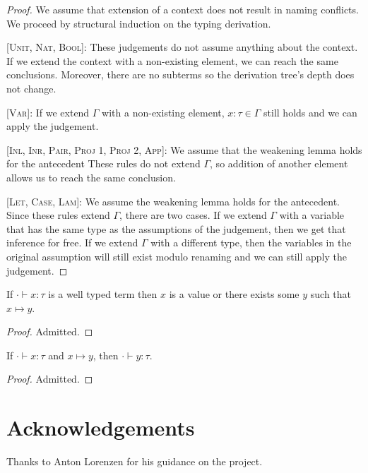 \documentclass[nonacm]{acmart}
\begin{document}
  \begin{proof}
    We assume that extension of a context does not result in naming conflicts.
    We proceed by structural induction on the typing derivation.

    [\textsc{Unit, Nat, Bool}]: These judgements do not assume anything about
    the context. If we extend the context with a non-existing element, we can
    reach the same conclusions. Moreover, there are no subterms so the derivation
    tree's depth does not change.

    [\textsc{Var}]: If we extend $\Gamma$ with a non-existing element, $x : \tau \in \Gamma$
    still holds and we can apply the judgement.

    [\textsc{Inl, Inr, Pair, Proj 1, Proj 2, App}]: We assume that the weakening
    lemma holds for the antecedent These rules do not extend $\Gamma$, so addition of
    another element allows us to reach the same conclusion.

    [\textsc{Let, Case, Lam}]: We assume the weakening lemma holds for the
    antecedent. Since these rules extend $\Gamma$, there are two cases. If we
    extend $\Gamma$ with a variable that has the same type as the assumptions of
    the judgement, then we get that inference for free. If we extend $\Gamma$ with
    a different type, then the variables in the original assumption will still
    exist modulo renaming and we can still apply the judgement.
  \end{proof}

  \begin{theorem}[Progress]
    If $\cdot \vdash x : \tau$ is a well typed term then $x$ is a value or there
    exists some $y$ such that $x \mapsto y$.
  \end{theorem}

  \begin{proof}
    Admitted.
  \end{proof}

  \begin{theorem}[Preservation]
    If $\cdot \vdash x : \tau$ and $x \mapsto y$, then $\cdot \vdash y : \tau$.
  \end{theorem}

  \begin{proof}
    Admitted.
  \end{proof}


  \section{Acknowledgements}

  Thanks to Anton Lorenzen for his guidance on the project.

  \printbibliography
\end{document}
